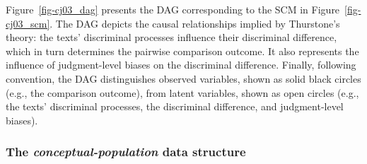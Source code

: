 \documentclass[
  authoryear,
  review,
  1p]{elsarticle}
\begin{document}
Figure~\ref{fig-cj03_dag} presents the DAG corresponding to the SCM in
Figure~\ref{fig-cj03_scm}. The DAG depicts the causal relationships
implied by Thurstone's theory: the texts' discriminal processes
influence their discriminal difference, which in turn determines the
pairwise comparison outcome. It also represents the influence of
judgment-level biases on the discriminal difference. Finally, following
convention, the DAG distinguishes observed variables, shown as solid
black circles (e.g., the comparison outcome), from latent variables,
shown as open circles (e.g., the texts' discriminal processes, the
discriminal difference, and judgment-level biases).

\subsubsection{\texorpdfstring{The \emph{conceptual-population} data
structure}{The conceptual-population data structure}}\label{sec-theory-theoretical_P2}
\end{document}
